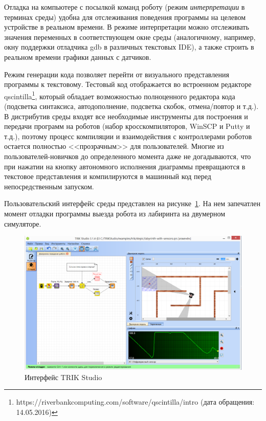 \documentclass[a5paper]{article}
\begin{document}
Отладка на компьютере с посылкой команд роботу (режим \textit{интерпретации} в терминах среды) удобна для отслеживания поведения программы на целевом устройстве в реальном времени. В режиме интерпретации можно отслеживать значения переменных в соответствующем окне среды (аналогичному, например, окну поддержки отладчика gdb в различных текстовых IDE), а также строить в реальном времени графики данных с датчиков.

Режим генерации кода позволяет перейти от визуального представления программы к текстовому. Тестовый код отображается во встроенном редакторе qscintilla\footnote{https://riverbankcomputing.com/software/qscintilla/intro (дата обращения: 14.05.2016)}, который обладает возможностью полноценного редактора кода (подсветка синтаксиса, автодополнение, подсветка скобок, отмена/повтор и т.д.). В дистрибутив среды входят все необходимые инструменты для построения и передачи программ на роботов (набор кросскомпиляторов, WinSCP и Putty и т.д.), поэтому процесс компиляции и взаимодействия с контроллерами роботов остается полностью <<прозрачным>> для пользователей. Многие из пользователей-новичков до определенного момента даже не догадываются, что при нажатии на кнопку автономного исполнения диаграммы превращаются в текстовое представления и компилируются в машинный код перед непосредственным запуском.

Пользовательский интерфейс среды представлен на рисунке~\ref{image:TS_interface}. На нем запечатлен момент отладки программы выезда робота из лабиринта на двумерном симуляторе.

\begin{figure}[ht]
    \centering
    \includegraphics[width=4.5in]{TS_CF_Labyrinth.png}
    \caption{Интерфейс TRIK Studio}
    \label{image:TS_interface}
\end{figure}
\end{document}
